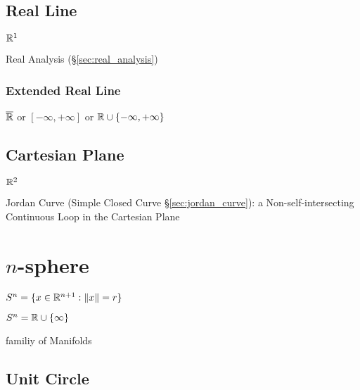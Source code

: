 \subsection{Real Line}\label{sec:real_line}

$\mathbb{R}^1$

\fist Real Analysis (\S\ref{sec:real_analysis})



\subsubsection{Extended Real Line}\label{sec:extended_real_line}

$\overline{\mathbb{R}}$ or $[-\infty, +\infty]$ or $\mathbb{R} \cup \{
-\infty, +\infty\}$




\subsection{Cartesian Plane}\label{sec:cartesian_plane}

$\mathbb{R}^2$

Jordan Curve (Simple Closed Curve \S\ref{sec:jordan_curve}): a
Non-self-intersecting Continuous Loop in the Cartesian Plane



\section{$n$-sphere}\label{sec:n_sphere}

$S^n = \{ x \in \mathbb{R}^{n+1} : \|x\| = r \}$

$S^n = \mathbb{R} \cup \{\infty\}$

familiy of Manifolds



\subsection{Unit Circle}\label{sec:unit_circle}

